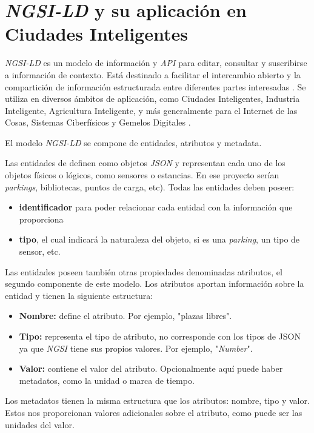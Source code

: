 \section{\textit{NGSI-LD} y su aplicación en Ciudades Inteligentes}\label{modelo-ngsi-ld}

\textit{NGSI-LD} es un modelo de información y \textit{API} para editar, consultar y suscribirse a información de contexto. Está destinado a facilitar el intercambio abierto y la compartición de información estructurada entre diferentes partes interesadas \cite{etsi_ngsi_ld}. Se utiliza en diversos ámbitos de aplicación, como Ciudades Inteligentes, Industria Inteligente, Agricultura Inteligente, y más generalmente para el Internet de las Cosas, Sistemas Ciberfísicos y Gemelos Digitales \cite{etsi_iot}.

El modelo \textit{NGSI-LD} se compone de entidades, atributos y metadata.

Las entidades de definen como objetos \textit{JSON} y representan cada uno de los objetos físicos o lógicos, como sensores o estancias. En ese proyecto serían \textit{parkings}, bibliotecas, puntos de carga, etc).
Todas las entidades deben poseer:
\begin{itemize}
    \item \textbf{identificador} para poder relacionar cada entidad con la información que proporciona
    \item \textbf{tipo}, el cual indicará la naturaleza del objeto, si es una \textit{parking}, un tipo de sensor, etc.
\end{itemize}

Las entidades poseen también otras propiedades denominadas atributos, el segundo componente de este modelo.
Los atributos aportan información sobre la entidad y tienen la siguiente estructura:
\begin{itemize}
    \item \textbf{Nombre:} define el atributo. Por ejemplo, "plazas libres".
    \item \textbf{Tipo:} representa el tipo de atributo, no corresponde con los tipos de JSON ya que \textit{NGSI} tiene sus propios valores. Por ejemplo, "\textit{Number}".
    \item \textbf{Valor:} contiene el valor del atributo. Opcionalmente aquí puede haber metadatos, como la unidad o marca de tiempo.
\end{itemize}

Los metadatos tienen la misma estructura que los atributos: nombre, tipo y valor. Estos nos proporcionan valores adicionales sobre el atributo, como puede ser las unidades del valor.

